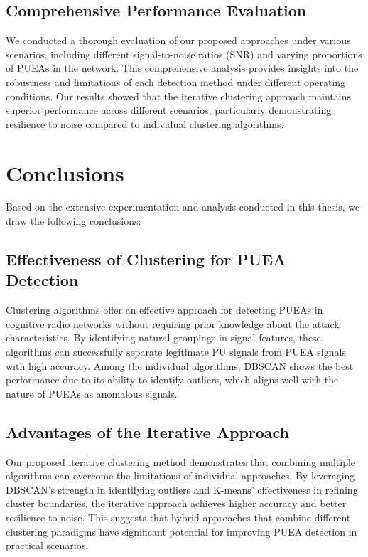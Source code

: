 \subsection{Comprehensive Performance Evaluation}
We conducted a thorough evaluation of our proposed approaches under various scenarios, including different signal-to-noise ratios (SNR) and varying proportions of PUEAs in the network. This comprehensive analysis provides insights into the robustness and limitations of each detection method under different operating conditions. Our results showed that the iterative clustering approach maintains superior performance across different scenarios, particularly demonstrating resilience to noise compared to individual clustering algorithms.

\section{Conclusions}
Based on the extensive experimentation and analysis conducted in this thesis, we draw the following conclusions:

\subsection{Effectiveness of Clustering for PUEA Detection}
Clustering algorithms offer an effective approach for detecting PUEAs in cognitive radio networks without requiring prior knowledge about the attack characteristics. By identifying natural groupings in signal features, these algorithms can successfully separate legitimate PU signals from PUEA signals with high accuracy. Among the individual algorithms, DBSCAN shows the best performance due to its ability to identify outliers, which aligns well with the nature of PUEAs as anomalous signals.

\subsection{Advantages of the Iterative Approach}
Our proposed iterative clustering method demonstrates that combining multiple algorithms can overcome the limitations of individual approaches. By leveraging DBSCAN's strength in identifying outliers and K-means' effectiveness in refining cluster boundaries, the iterative approach achieves higher accuracy and better resilience to noise. This suggests that hybrid approaches that combine different clustering paradigms have significant potential for improving PUEA detection in practical scenarios.


